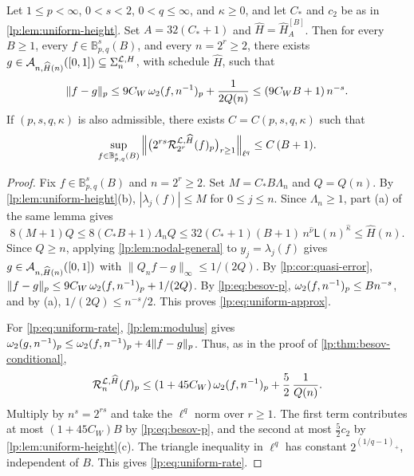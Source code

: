 \documentclass[11pt,a4paper]{article}
\begin{document}
\begin{teorema}
\label{lp:thm:uniform}
Let $1\le p<\infty$, $0<s<2$, $0<q\le\infty$, and $\kappa\ge0$, and let $C_*$ and $c_2$ be as in \cref{lp:lem:uniform-height}. Set $A=32(C_*+1)$ and $\widehat H=\widehat H^{[B]}_{A}$. Then for every $B\ge1$, every $f\in\mathbb B^s_{p,q}(B)$, and every $n=2^r\ge2$, there exists $g\in\mathcal A_{n,\widehat H(n)}([0,1])\subseteq\Sigma_{n}^{\mathcal L,H}$, with schedule $\widehat H$, such that
\begin{equation}
 \|f-g\|_p\le9C_W\,\omega_2(f,n^{-1})_{p}+\frac1{2Q(n)}\le(9C_WB+1)\,n^{-s}.
 \label{lp:eq:uniform-approx}
\end{equation}
If $(p,s,q,\kappa)$ is also admissible, there exists $C=C(p,s,q,\kappa)$ such that
\begin{equation}
 \sup_{f\in\mathbb B^s_{p,q}(B)}\Big\|\big(2^{rs}\mathcal R^{\mathcal L,\widehat H}_{2^r}(f)_p\big)_{r\ge1}\Big\|_{\ell^q}\le C\,(B+1).
 \label{lp:eq:uniform-rate}
\end{equation}
\end{teorema}

\begin{proof}
Fix $f\in\mathbb B^s_{p,q}(B)$ and $n=2^r\ge2$. Set $M=C_*B\Lambda_n$ and $Q=Q(n)$. By \cref{lp:lem:uniform-height}(b), $|\lambda_j(f)|\le M$ for $0\le j\le n$. Since $\Lambda_n\ge1$, part (a) of the same lemma gives
\[
 8(M+1)Q\le8(C_*B+1)\Lambda_nQ\le32(C_*+1)(B+1)\,n^{\hat\nu}\mathsf L(n)^{\hat\kappa}\le\widehat H(n).
\]
Since $Q\ge n$, applying \cref{lp:lem:nodal-general} to $y_j=\lambda_j(f)$ gives $g\in\mathcal A_{n,\widehat H(n)}([0,1])$ with $\|Q_nf-g\|_\infty\le1/(2Q)$. By \cref{lp:cor:quasi-error}, $\|f-g\|_p\le9C_W\,\omega_2(f,n^{-1})_{p}+1/(2Q)$. By \eqref{lp:eq:besov-p}, $\omega_2(f,n^{-1})_{p}\le Bn^{-s}$, and by (a), $1/(2Q)\le n^{-s}/2$. This proves \eqref{lp:eq:uniform-approx}.

For \eqref{lp:eq:uniform-rate}, \cref{lp:lem:modulus} gives $\omega_2(g,n^{-1})_{p}\le\omega_2(f,n^{-1})_{p}+4\|f-g\|_p$. Thus, as in the proof of \cref{lp:thm:besov-conditional},
\[
 \mathcal R^{\mathcal L,\widehat H}_{n}(f)_p\le(1+45C_W)\,\omega_2(f,n^{-1})_{p}+\frac52\,\frac1{Q(n)}.
\]
Multiply by $n^s=2^{rs}$ and take the $\ell^q$ norm over $r\ge1$. The first term contributes at most $(1+45C_W)B$ by \eqref{lp:eq:besov-p}, and the second at most $\tfrac52c_2$ by \cref{lp:lem:uniform-height}(c). The triangle inequality in $\ell^q$ has constant $2^{(1/q-1)_+}$, independent of $B$. This gives \eqref{lp:eq:uniform-rate}.
\end{proof}
\end{document}
